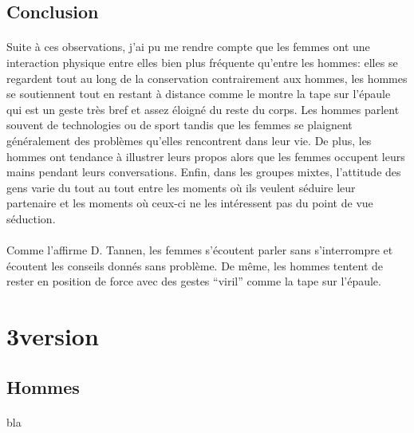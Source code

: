 \subsection{Conclusion}

\paragraph{} Suite à ces observations, j'ai pu me rendre compte que les femmes
ont une interaction physique entre elles bien plus fréquente qu'entre les
hommes: elles se regardent tout au long de la conservation contrairement aux
hommes, les hommes se soutiennent tout en restant à distance comme le montre la
tape sur l'épaule qui est un geste très bref et assez éloigné du reste du
corps. Les hommes parlent souvent de technologies ou de sport tandis que les
femmes se plaignent généralement des problèmes qu'elles rencontrent dans leur
vie. De plus, les hommes ont tendance à illustrer leurs propos alors que les
femmes occupent leurs mains pendant leurs conversations. Enfin, dans les
groupes mixtes, l'attitude des gens varie du tout au tout entre les moments où
ils veulent séduire leur partenaire et les moments où ceux-ci ne les
intéressent pas du point de vue séduction.

\paragraph{} Comme l'affirme D. Tannen, les femmes s'écoutent parler sans
s'interrompre et écoutent les conseils donnés sans problème. De même, les
hommes tentent de rester en position de force avec des gestes ``viril'' comme
la tape sur l'épaule.

\section{3\ieme version}

\paragraph{}

\subsection{Hommes}

\paragraph{}
bla

